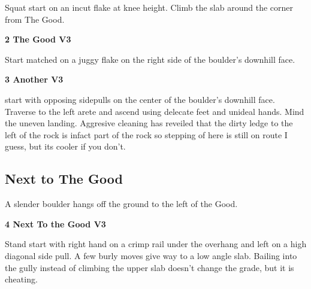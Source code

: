 \begin{multicols}{2}
\begin{minipage}{\linewidth}
					\begin{adjustwidth}{0.5cm}{}				
					Squat start on an incut flake at knee height. Climb the slab around the corner from The Good.
					\end{adjustwidth}
					\end{minipage}

					\begin{minipage}{\linewidth}	
					\label{rt:The Good}
\colorbox{green!20}{
\parbox{0.95\textwidth}{
\textbf{
2 The Good V3    
}
}
}

					\begin{adjustwidth}{0.5cm}{}				
					Start matched on a juggy flake on the right side of the boulder's downhill face.
					\end{adjustwidth}
					\end{minipage}
					\begin{minipage}{\linewidth}	
					\label{rt:Another}
\colorbox{green!20}{
\parbox{0.95\textwidth}{
\textbf{
3 Another V3   \warn 
}
}
}

					\begin{adjustwidth}{0.5cm}{}				
					start with opposing sidepulls on the center of the boulder's downhill face. Traverse to the left arete and ascend using delecate feet and unideal hands. Mind the uneven landing. Aggresive cleaning has reveiled that the dirty ledge to the left of the rock is infact part of the rock so stepping of here is still on route I guess, but its cooler if you don't.
					\end{adjustwidth}
					\end{minipage}
			\subsection*{Next to The Good}\label{bf:Next to The Good}
			\begin{minipage}{\columnwidth}
			A slender boulder hangs off the ground to the left of the Good.
			\end{minipage}
			
					\begin{minipage}{\linewidth}	
					\label{rt:Next To the Good}
\colorbox{green!20}{
\parbox{0.95\textwidth}{
\textbf{
4 Next To the Good V3   \warn 
}
}
}

					\begin{adjustwidth}{0.5cm}{}				
					Stand start with right hand on a crimp rail under the overhang and left on a high diagonal side pull. A few burly moves give way to a low angle slab. Bailing into the gully instead of climbing the upper slab doesn't change the grade, but it is cheating.
					\end{adjustwidth}
					\end{minipage}

\end{multicols}

